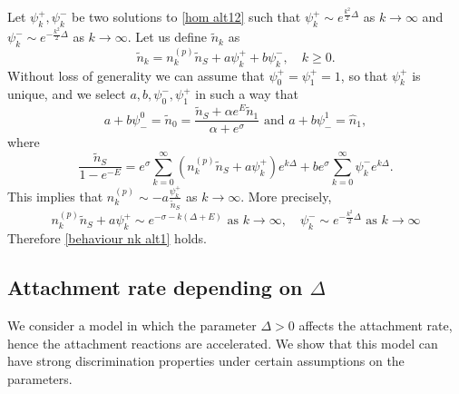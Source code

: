 \documentclass{article}
\numberwithin{equation}{section}
\theoremstyle{plain}
\begin{document}
Let $\psi_k^+ , \psi_k^-$ be two solutions to \eqref{hom alt12} such that $\psi_k^+ \sim e^{\frac{k^2 }{2} \Delta }$ as $k \to \infty $ and $\psi_k^- \sim e^{- \frac{k^2 }{2} \Delta }$ as $ k \to  \infty$.  
Let us define $\tilde{n}_k $ as 
\[ 
\tilde{n}_k = n_k^{(p)} \tilde{n}_S + a \psi_k^+ + b \psi_k^-, \quad k \geq 0. 
\]
Without loss of generality we can assume that $\psi_0^+= \psi_1^+=1$, so that $\psi^+_k$ is unique, and we select $a,b,\psi_0^- , \psi_1^+$ in such a way that 
\[
 a + b \psi_-^0 = \tilde{n}_0 = \frac{ \tilde{n}_S + \alpha e^E \tilde{n}_1 }{ \alpha + e^\sigma }  \text{ and } a +b\psi_-^1  =\hat{n}_1, 
\]
where 
\[
 \frac{ \tilde{n}_S  }{1-e^{-E}}  =  e^{\sigma }  \sum_{k=0}^{\infty} (n_k^{(p)} \tilde{n}_S + a \psi_k^+  )  e^{k \Delta } + b  e^{\sigma }  \sum_{k=0}^{\infty} \psi_k^-  e^{k \Delta }.
\]
This implies that $n_k^{(p)}\sim - a \frac{\psi_k^+}{\tilde{n}_S} $ as $k \to \infty $. More precisely, 
\[ 
n_k^{(p)} \tilde{n}_S + a \psi_k^+ \sim  e^{- \sigma - k (\Delta+ E) } \text{ as } k \to \infty , \quad \psi_k^- \sim e^{- \frac{k^2}{2 } \Delta  } \text{ as } k \to \infty
\]
Therefore \eqref{behaviour nk alt1} holds. 




\subsection{Attachment rate depending on $\Delta $}

We consider a model in which the parameter $\Delta >0$ affects the attachment rate, hence the attachment reactions are accelerated. 
We show that this model can have strong discrimination properties under certain assumptions on the parameters. 
\end{document}
